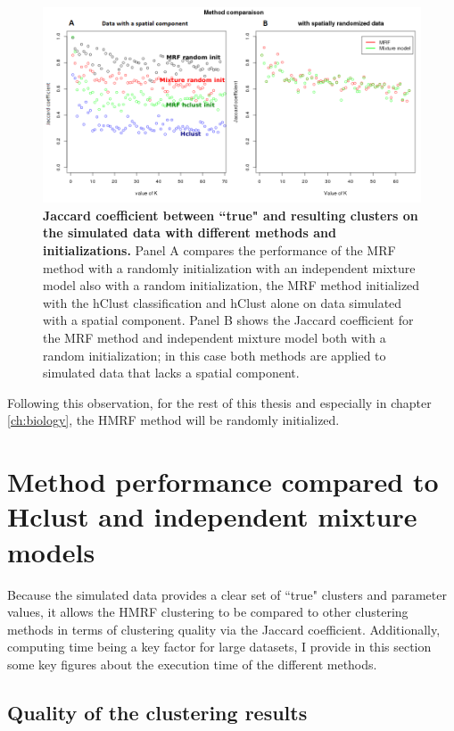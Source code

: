 	\begin{figure}[h]
\centerline{\includegraphics[width=0.9\linewidth]{gfx/chapter5/method_comparison.png}}
\caption{{\bf Jaccard coefficient between ``true" and resulting clusters on the simulated data with different methods and initializations.} Panel A compares the performance of the MRF method with a randomly initialization with an independent mixture model also with a random initialization, the MRF method initialized with the hClust classification and hClust alone on data simulated with a spatial component. Panel B shows the Jaccard coefficient for the MRF method and independent mixture model both with a random initialization; in this case both methods are applied to simulated data that lacks a spatial component.}
\label{fig:methodComparison}
	\end{figure}

Following this observation, for the rest of this thesis and especially in chapter \ref{ch:biology}, the HMRF method will be randomly initialized.

\section{Method performance compared to Hclust and independent mixture models}
 Because the simulated data provides a clear set of ``true" clusters and parameter values, it allows the HMRF clustering to be compared to other clustering methods in terms of clustering quality via the Jaccard coefficient. Additionally, computing time being a key factor for large datasets, I provide in this section some key figures about the execution time of the different methods.
	\subsection{Quality of the clustering results}
	
